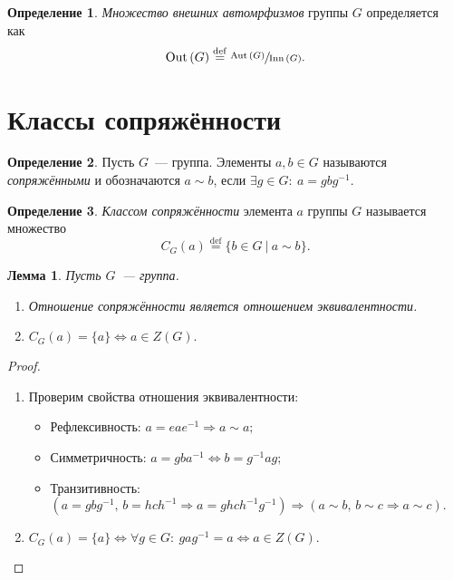 \documentclass[a4paper, 14pt]{extarticle}
\newcommand{\deq}{\stackrel{\mathrm{def}}{=}}
\newcommand{\suchthat}{{:}{ } \ }
\newcommand{\Aut}{\mathrm{Aut} \,}
\newcommand{\Inn}{\mathrm{Inn} \,}
\theoremstyle{definition}
\newtheorem{definition}{Определение}
\theoremstyle{plain}
\numberwithin{theorem}{section}
\numberwithin{definition}{section}
\numberwithin{statement}{section}
\newtheorem{lemma}{Лемма}
\numberwithin{lemma}{section}
\numberwithin{consequence}{section}
\begin{document}
          \begin{definition}
              \textit{Множество внешних автомрфизмов} группы $G$ определяется как\
              \begin{equation*}
                  \mathrm{Out}\,(G) \deq \sfrac{\Aut(G)}{\Inn(G)}.
              \end{equation*}
          \end{definition}
        \newpage
        \section{Классы сопряжённости}
        \setcounter{definition}{0}
        \begin{definition}
            Пусть $G$~--- группа. Элементы ${a,b \in G}$ называются \textit{сопряжёнными} и обозначаются ${a \sim b}$, если ${\exists g \in G\suchthat a = gbg^{-1}.}$
        \end{definition}
        \begin{definition}
            \textit{Классом сопряжённости} элемента $a$ группы $G$ называется множество
            \begin{equation*}
                C_G(a) \deq \{b \in G \ | \ a \sim b\}.
            \end{equation*}
        \end{definition}
        \begin{lemma}
            Пусть $G$~--- группа.
            \begin{enumerate}
            \setlength\itemsep{0.1em}
                \item Отношение сопряжённости является отношением эквивалентности.
                \item ${C_G(a) = \{a\} \Leftrightarrow a \in Z(G).}$
            \end{enumerate}
        \end{lemma}
        \begin{proof}
            \
            \begin{enumerate}
            
                \item Проверим свойства отношения эквивалентности:
                \begin{itemize}
                \setlength\itemsep{0.1em}
                    \item Рефлексивность: ${a = eae^{-1} \Rightarrow a \sim a;}$
                    \item Симметричность: ${a = gba^{-1} \Leftrightarrow b = g^{-1}ag;}$
                    \item Транзитивность: ${(a = gbg^{-1}, \, b = hch^{-1} \Rightarrow a = ghch^{-1}g^{-1}) \Rightarrow (a \sim b, \, b \sim c \Rightarrow a \sim c).}$
                \end{itemize}
                \item ${C_G(a) = \{a\} \Leftrightarrow \forall g \in G\suchthat gag^{-1} = a \Leftrightarrow a \in Z(G).}$ \qedhere
            \end{enumerate}
        \end{proof}
\end{document}
